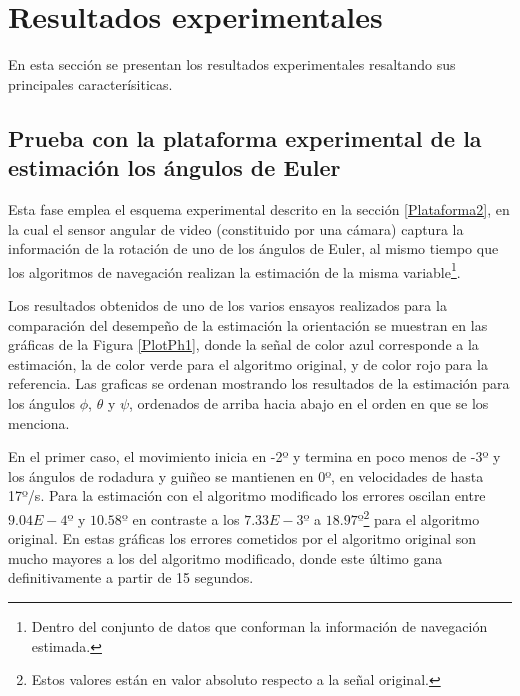 \documentclass[conference]{IEEEtran}
\begin{document}
\section{Resultados experimentales}
En esta sección se presentan los resultados experimentales resaltando sus principales caracterísiticas.
\subsection{Prueba con la plataforma experimental de la estimación los ángulos de Euler}
Esta fase emplea el esquema experimental descrito en la sección \ref{Plataforma2}, en la cual el sensor angular de video (constituido por una cámara) captura la información de la rotación de uno de los ángulos de Euler, al mismo tiempo que los algoritmos de navegación realizan la estimación de la misma variable\footnote{Dentro del conjunto de datos que conforman la información de navegación estimada.}.\par
Los resultados obtenidos de uno de los varios ensayos realizados para la comparación del desempeño de la estimación la orientación se muestran en las gráficas de la Figura \ref{PlotPh1}, donde la señal de color azul corresponde a la estimación, la de color verde para el  algoritmo original, y de color rojo para la referencia. Las graficas se ordenan mostrando los resultados de la estimación para los ángulos $\phi$, $\theta$ y $\psi$, ordenados de arriba hacia abajo en el orden en que se los menciona.\par
En el primer caso, el movimiento inicia en -2º y termina en poco menos de -3º y los ángulos de rodadura y guiñeo se mantienen en 0º, en velocidades  de hasta 17º/s. Para la estimación con el algoritmo modificado los errores oscilan entre $9.04E-4º$ y $10.58º$ en contraste a los $7.33E-3º$ a $18.97º$\footnote{Estos valores están en valor absoluto respecto a la señal original.} para el algoritmo original. 
En estas gráficas los errores cometidos por el algoritmo original son mucho mayores a los del algoritmo modificado, donde este último gana definitivamente a partir de 15 segundos.\par
\end{document}
